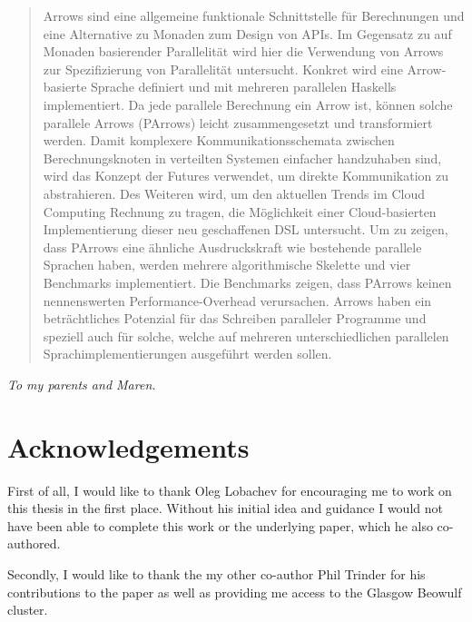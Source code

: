 \documentclass[paper=A4,twoside=true,openright,parskip=full,chapterprefix=true,headings=normal,bibliography=totoc,listof=totoc,titlepage=on,captions=tableabove,draft=false,british]{scrreprt}%
\begin{document}
\pagestyle{plain}
\begin{abstract}
Arrows sind eine allgemeine funktionale Schnittstelle für Berechnungen und eine Alternative zu Monaden zum Design von APIs.
Im Gegensatz zu auf Monaden basierender Parallelität wird hier die Verwendung von Arrows zur Spezifizierung von Parallelität untersucht.
Konkret wird eine Arrow-basierte Sprache definiert und mit mehreren parallelen Haskells implementiert.
Da jede parallele Berechnung ein Arrow ist, können solche parallele Arrows (PArrows) leicht zusammengesetzt und transformiert werden.
Damit komplexere Kommunikationsschemata zwischen Berechnungsknoten in verteilten Systemen einfacher handzuhaben sind, wird das Konzept der Futures verwendet,
um direkte Kommunikation zu abstrahieren.
Des Weiteren wird, um den aktuellen Trends im Cloud Computing Rechnung zu tragen, die Möglichkeit einer Cloud-basierten Implementierung dieser
neu geschaffenen DSL untersucht.
Um zu zeigen, dass PArrows eine ähnliche Ausdruckskraft wie bestehende parallele Sprachen haben,
werden mehrere algorithmische Skelette und vier Benchmarks implementiert.
Die Benchmarks zeigen, dass PArrows keinen nennenswerten Performance-Overhead verursachen.
Arrows haben ein beträchtliches Potenzial für das Schreiben paralleler Programme und speziell auch für solche,
welche auf mehreren unterschiedlichen parallelen Sprachimplementierungen ausgeführt werden sollen.
\end{abstract}
\cleardoublepage

\pagestyle{empty}
\begin{center}
\vspace*{\fill}
\textit{To my parents and Maren.}
\vspace*{\fill}
\end{center}

\cleardoublepage

\chapter*{Acknowledgements}
\thispagestyle{empty}

First of all, I would like to thank Oleg Lobachev for encouraging me
to work on this thesis in the first place.
Without his initial idea and guidance I would
not have been able to complete this work or the underlying paper,
which he also co-authored.

Secondly, I would like to thank the my other co-author
Phil Trinder for his contributions to the paper as well as providing me access to the
Glasgow Beowulf cluster.
\end{document}
